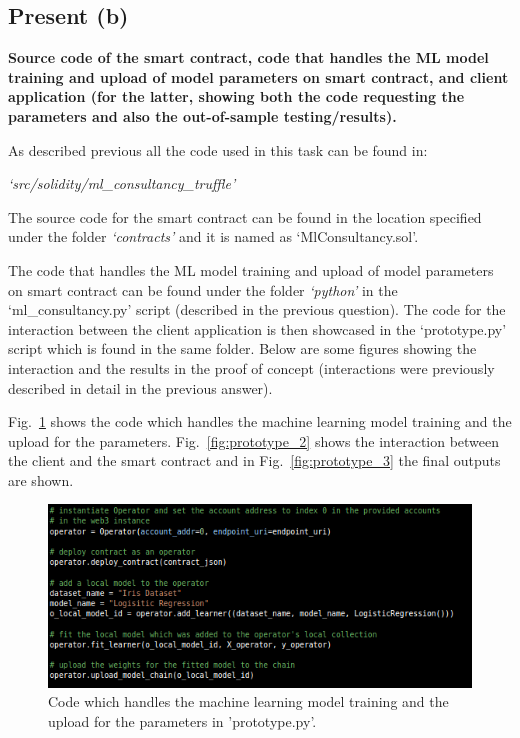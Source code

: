 \subsection{Present (b)}\label{sssec:pt2q5a}

\textbf{Source code of the smart contract, code that handles the ML model training and upload of model parameters on smart contract, and client application (for the latter, showing both the code requesting the parameters and also the out-of-sample testing/results).}

\noindent
As described previous all the code used in this task can be found in:

\noindent
\textit{‘src/solidity/ml\_consultancy\_truffle’}

\noindent
The source code for the smart contract can be found in the location specified under the folder \textit{‘contracts’} and it is named as ‘MlConsultancy.sol’. 

\noindent
The code that handles the ML model training and upload of model parameters on smart contract can be found under the folder \textit{‘python’} in the ‘ml\_consultancy.py’ script (described in the previous question). The code for the interaction between the client application is then showcased in the ‘prototype.py’ script which is found in the same folder. Below are some figures showing the interaction and the results in the proof of concept (interactions were previously described in detail in the previous answer). 

\noindent
Fig.~\ref{fig:prototype_1} shows the code which handles the machine learning model training and the upload for the parameters. Fig.~\ref{fig:prototype_2} shows the interaction between the client and the smart contract and in Fig.~\ref{fig:prototype_3} the final outputs are shown. 


\begin{figure}[H]
\centering
  \includegraphics[scale = .65]{imgs/prototype_1.png}
  \caption{Code which handles the machine learning model training and the upload for the parameters in 'prototype.py'.}
  \label{fig:prototype_1}
\end{figure}

